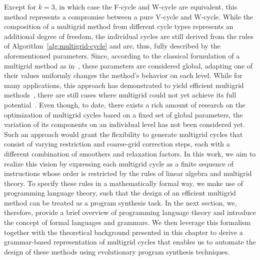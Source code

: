 Except for $k = 3$, in which case the F-cycle and W-cycle are equivalent, this method represents a compromise between a pure V-cycle and W-cycle.
While the composition of a multigrid method from different cycle types represents an additional degree of freedom, the individual cycles are still derived from the rules of Algorithm~\ref{alg:multigrid-cycle} and are, thus, fully described by the aforementioned parameters.
Since, according to the classical formulation of a multigrid method as in~\cite{brandt1977multi,hackbusch2013multi,trottenberg2000multigrid,briggs2000multigrid}, these parameters are considered global, adapting one of their values uniformly changes the method's behavior on each level. 
While for many applications, this approach has demonstrated to yield efficient multigrid methods~\cite{trottenberg2000multigrid}, there are still cases where multigrid could not yet achieve its full potential~\cite{ernst2012difficult,benzi2005numerical}.
Even though, to date, there exists a rich amount of research on the optimization of multigrid cycles based on a fixed set of global parameters, the variation of its components on an individual level has not been considered yet.
Such an approach would grant the flexibility to generate multigrid cycles that consist of varying restriction and coarse-grid correction steps, each with a different combination of smoothers and relaxation factors.
In this work, we aim to realize this vision by expressing each multigrid cycle as a finite sequence of instructions whose order is restricted by the rules of linear algebra and multigrid theory.
To specify these rules in a mathematically formal way, we make use of programming language theory, such that the design of an efficient multigrid method can be treated as a program synthesis task.
In the next section, we, therefore, provide a brief overview of programming language theory and introduce the concept of formal languages and grammars.
We then leverage this formalism together with the theoretical background presented in this chapter to derive a grammar-based representation of multigrid cycles that enables us to automate the design of these methods using evolutionary program synthesis techniques.
